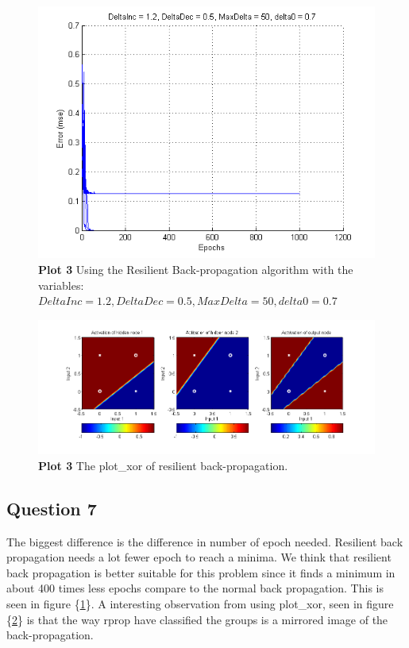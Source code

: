 \documentclass[a4paper]{article}
\begin{document}
\begin{figure}[h!] %
	\includegraphics[]{plot3_rprop.png}
	\caption{\label{fig:plot3_rprop}\textbf{Plot 3} Using the Resilient Back-propagation algorithm with the variables: $DeltaInc = 1.2, DeltaDec = 0.5, MaxDelta = 50, delta0 = 0.7$}
\end{figure}
\begin{figure}[h!] %
	\includegraphics[scale=0.55]{good_rprop_xor_plot.png}
	\caption{\label{fig:good_rprop_xor_plot}\textbf{Plot 3} The plot\_xor of resilient back-propagation.}
\end{figure}
\subsection*{Question 7}
The biggest difference is the difference in number of epoch needed. Resilient back propagation needs a lot fewer epoch to reach a minima.
We think that resilient back propagation is better suitable for this problem since it finds a minimum in about 400 times less epochs compare to the normal back propagation. This is seen in figure \{\ref{fig:plot3_rprop}\}.
A interesting observation from using plot\_xor, seen in figure \{\ref{fig:good_rprop_xor_plot}\} is that the way rprop have classified the groups is a mirrored image of the back-propagation. 
\end{document}
